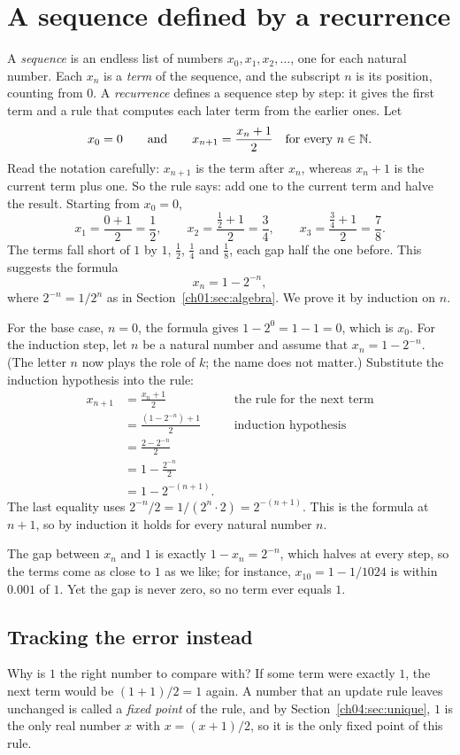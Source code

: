 \section{A sequence defined by a recurrence}\label{ch05:sec:recurrence}
A \emph{sequence} is an endless list of numbers $x_0,x_1,x_2,\ldots$, one for each natural number. Each $x_n$ is a \emph{term} of the sequence, and the subscript $n$ is its position, counting from $0$. A \emph{recurrence} defines a sequence step by step: it gives the first term and a rule that computes each later term from the earlier ones. Let
\[
x_0=0\qquad\text{and}\qquad x_{n+1}=\frac{x_n+1}{2}\quad\text{for every } n\in\mathbb N.
\]
Read the notation carefully: $x_{n+1}$ is the term after $x_n$, whereas $x_n+1$ is the current term plus one. So the rule says: add one to the current term and halve the result. Starting from $x_0=0$,
\[
x_1=\frac{0+1}{2}=\frac12,\qquad x_2=\frac{\frac12+1}{2}=\frac34,\qquad x_3=\frac{\frac34+1}{2}=\frac78.
\]
The terms fall short of $1$ by $1$, $\tfrac12$, $\tfrac14$ and $\tfrac18$, each gap half the one before. This suggests the formula
\[
x_n=1-2^{-n},
\]
where $2^{-n}=1/2^n$ as in Section~\ref{ch01:sec:algebra}. We prove it by induction on $n$.

For the base case, $n=0$, the formula gives $1-2^{0}=1-1=0$, which is $x_0$. For the induction step, let $n$ be a natural number and assume that $x_n=1-2^{-n}$. (The letter $n$ now plays the role of $k$; the name does not matter.) Substitute the induction hypothesis into the rule:
\begin{align*}
 x_{n+1}
 &=\frac{x_n+1}{2} &&\text{the rule for the next term}\\
 &=\frac{(1-2^{-n})+1}{2} &&\text{induction hypothesis}\\
 &=\frac{2-2^{-n}}2\\
 &=1-\frac{2^{-n}}2\\
 &=1-2^{-(n+1)}.
\end{align*}
The last equality uses $2^{-n}/2=1/(2^n\cdot2)=2^{-(n+1)}$. This is the formula at $n+1$, so by induction it holds for every natural number $n$.

The gap between $x_n$ and $1$ is exactly $1-x_n=2^{-n}$, which halves at every step, so the terms come as close to $1$ as we like; for instance, $x_{10}=1-1/1024$ is within $0.001$ of $1$. Yet the gap is never zero, so no term ever equals $1$.

\subsection*{Tracking the error instead}
Why is $1$ the right number to compare with? If some term were exactly $1$, the next term would be $(1+1)/2=1$ again. A number that an update rule leaves unchanged is called a \emph{fixed point} of the rule, and by Section~\ref{ch04:sec:unique}, $1$ is the only real number $x$ with $x=(x+1)/2$, so it is the only fixed point of this rule.

